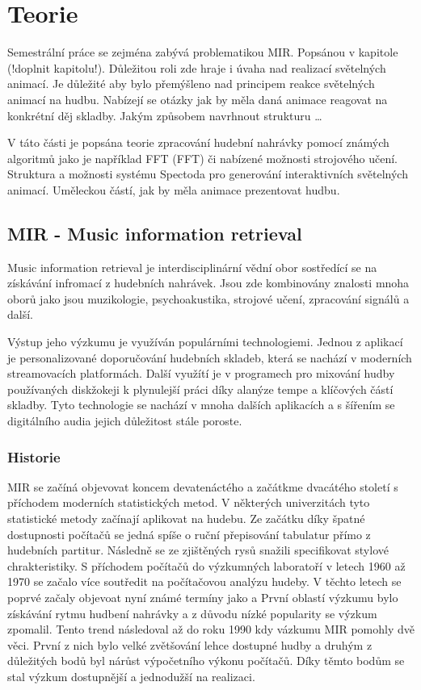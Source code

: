 \chapter{Teorie}

Semestrální práce se zejména zabývá problematikou \acs{MIR}. Popsánou v kapitole (!doplnit kapitolu!).
Důležitou roli zde hraje i úvaha nad realizací světelných animací.
Je důležité aby bylo přemýšleno nad principem reakce světelných animací na hudbu.
Nabízejí se otázky jak by měla daná animace reagovat na konkrétní děj skladby.
Jakým způsobem navrhnout strukturu \dots

V táto části je popsána teorie zpracování hudební nahrávky pomocí známých algoritmů jako je například \acs{FFT} (\acl{FFT}) 
či nabízené možnosti strojového učení. Struktura a možnosti systému Spectoda pro generování interaktivních světelných animací.
Uměleckou částí, jak by měla animace prezentovat hudbu.

\section{MIR - Music information retrieval}
    Music information retrieval je interdisciplinární vědní obor sostředící se na získávání infromací z hudebních nahrávek.
    Jsou zde kombinovány znalosti mnoha oborů jako jsou muzikologie, psychoakustika, strojové učení, zpracování signálů a další. 
    

    Výstup jeho výzkumu je využíván populárními technologiemi. 
    Jednou z aplikací je personalizované doporučování hudebních skladeb, která se nachází v moderních streamovacích platformách.
    Další využítí je v programech pro mixování hudby používaných diskžokeji k plynulejší práci díky alanýze tempe a klíčových částí skladby.
    Tyto technologie se nachází v mnoha dalších aplikacích a s šířením se digitálního audia jejich důležitost stále poroste.
    \cite{lidy09:448[TUW-181186]}\cite{a_new_companion_to_digital_humanities}
    
    \subsection{Historie}
    \acs*{MIR} se začíná objevovat koncem devatenáctého a začátkme dvacátého století s příchodem moderních statistických metod.
    V některých univerzitách tyto statistické metody začínají aplikovat na hudebu.
    Ze začátku díky špatné dostupnosti počítačů se jedná spíše o ruční přepisování tabulatur přímo z hudebních partitur.
    Následně se ze zjištěných rysů snažili specifikovat stylové chrakteristiky.  
    S příchodem počítačů do výzkumných laboratoří v letech 1960 až 1970 se začalo více soutředit na počítačovou analýzu hudeby.
    V těchto letech se poprvé začaly objevoat nyní známé termíny jako  a 
    První oblastí výzkumu bylo získávání rytmu hudbení nahrávky a z důvodu nízké popularity se výzkum zpomalil.
    Tento trend následoval až do roku 1990 kdy vázkumu \acs*{MIR} pomohly dvě věci.
    První z nich bylo velké zvětšování lehce dostupné hudby a druhým z důležitých bodů byl nárůst výpočetního výkonu počítačů.
    Díky těmto bodům se stal výzkum dostupnější a jednodužší na realizaci.

